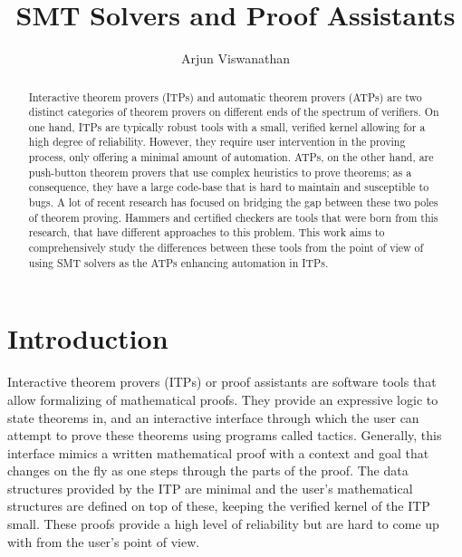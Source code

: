 \documentclass{article}
\begin{document}
\title{SMT Solvers and Proof Assistants}
\author{Arjun Viswanathan}
\date{}
\maketitle
\begin{abstract}
	Interactive theorem provers (ITPs) and automatic theorem provers (ATPs)
	are two distinct categories of theorem provers on different ends 
	of the spectrum of verifiers. On one hand, 
	ITPs are typically robust tools with a small, verified kernel 
	allowing for a high degree of reliability. However, they 
	require user intervention in the proving process, only
	offering a minimal amount of automation. ATPs, on the other hand, 
	are push-button theorem provers that use complex heuristics to prove 
	theorems; as a consequence, they have a large code-base that is hard 
	to maintain and susceptible to bugs. A lot of recent research 
	has focused on bridging the gap between these two poles 
	of theorem proving. Hammers and certified checkers are tools
	that were born from this research, that have different 
	approaches to this problem. This work aims to 
	comprehensively study the differences between these 
	tools from the point of view of using SMT solvers as
	the ATPs enhancing automation in ITPs.
\end{abstract}

\section{Introduction}
\label{sec:intro}
	Interactive theorem provers (ITPs) or proof assistants are 
	software tools that allow formalizing of mathematical proofs.
	They provide an expressive logic to state theorems in, and 
	an interactive interface through which the user can 
	attempt to prove these theorems using programs 
	called tactics. Generally, this interface mimics a 
	written mathematical proof with a context and goal 
	that changes on the fly as one steps through the parts 
	of the proof. The data structures provided by the ITP are 
	minimal and the user's mathematical structures are 
	defined on top of these, keeping the verified kernel of the 
	ITP small. These proofs provide a high level of reliability
	but are hard to come up with from the user's point of view. 
	
\end{document}
